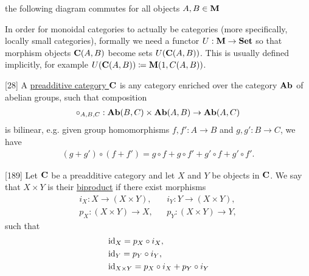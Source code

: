 \begin{definition}
\begin{defenum}
    \item the following diagram commutes for all objects $A, B \in \operatorname{\mathbf{M}}$

    \begin{center}
    \end{center}
  \end{defenum}

  In order for monoidal categories to actually be categories (more specifically, locally small categories), formally we need a functor $U: \operatorname{\mathbf{M}} \to \operatorname{\mathbf{Set}}$ so that morphism objects $\operatorname{\mathbf{C}}(A, B)$ become sets $U(\operatorname{\mathbf{C}}(A, B))$. This is usually defined implicitly, for example $U(\operatorname{\mathbf{C}}(A, B)) \coloneqq \operatorname{\mathbf{M}}(1, C(A, B))$.
\end{definition}

\begin{definition}\label{def:preadditive_category}\cite{MacLane1994}[28]
  A \uline{preadditive category $\operatorname{\mathbf{C}}$} is any category enriched over the category $\operatorname{\mathbf{Ab}}$ of abelian groups, such that composition
  \begin{align*}
    \circ_{A,B,C}: \operatorname{\mathbf{Ab}}(B, C) \times \operatorname{\mathbf{Ab}}(A, B) \to \operatorname{\mathbf{Ab}}(A, C)
  \end{align*}
  is bilinear, e.g. given group homomorphisms $f, f': A \to B$ and $g, g': B \to C$, we have
  \begin{align*}
    (g + g') \circ (f + f') = g \circ f + g \circ f' + g' \circ f + g' \circ f'.
  \end{align*}
\end{definition}

\begin{definition}\label{def:categorical_biproduct}\cite{MacLane1994}[189]
  Let $\operatorname{\mathbf{C}}$ be a preadditive category and let $X$ and $Y$ be objects in $\operatorname{\mathbf{C}}$. We say that $X \times Y$ is their \uline{biproduct} if there exist morphisms
  \begin{align*}
    i_X: X \to (X \times Y), && i_Y: Y \to (X \times Y), \\
    p_X: (X \times Y) \to X, && p_Y: (X \times Y) \to Y,
  \end{align*}
  such that
  \begin{align*}
    &\operatorname{id}_X = p_X \circ i_X, \\
    &\operatorname{id}_Y = p_Y \circ i_Y, \\
    &\operatorname{id}_{X \times Y} = p_X \circ i_X + p_Y \circ i_Y
  \end{align*}
\end{definition}

